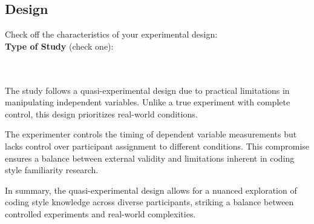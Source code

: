 \documentclass{article}
\begin{document}
\subsection{Design}
Check off the characteristics of your experimental design:\\

\textbf{Type of Study} (check one):\\
\noindent
\begin{minipage}{0.4\textwidth}
\end{minipage}%
\begin{minipage}{0.4\textwidth}
\end{minipage}%
\begin{minipage}{0.2\textwidth}
\end{minipage}\\\\
The study follows a quasi-experimental design due to practical limitations in manipulating independent variables. Unlike a true experiment with complete control, this design prioritizes real-world conditions.

The experimenter controls the timing of dependent variable measurements but lacks control over participant assignment to different conditions. This compromise ensures a balance between external validity and limitations inherent in coding style familiarity research.

In summary, the quasi-experimental design allows for a nuanced exploration of coding style knowledge across diverse participants, striking a balance between controlled experiments and real-world complexities.
\\
\end{document}
